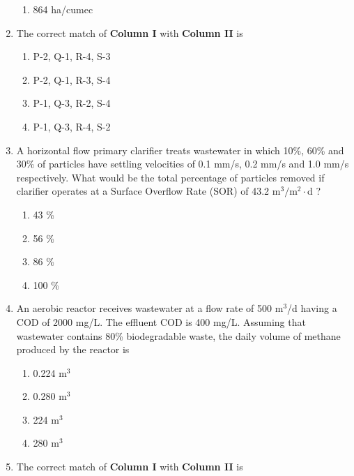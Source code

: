 \documentclass[journal]{IEEEtran}
\begin{document}
\begin{enumerate}
\begin{enumerate}
     \item 864 ha/cumec \\
 \end{enumerate}
\item The correct match of \textbf{Column I} with \textbf{Column II} is 
\begin{table}[h!]
  \centering
  
\end{table} 
\begin{enumerate}
    \item P-2, Q-1, R-4, S-3
    \item P-2, Q-1, R-3, S-4
    \item P-1, Q-3, R-2, S-4
    \item P-1, Q-3, R-4, S-2 \\
\end{enumerate}
\item A horizontal flow primary clarifier treats wastewater in which 10\%, 60\% and 30\% of particles have settling velocities of 0.1 mm/s, 0.2 mm/s and 1.0 mm/s respectively. What would be the total percentage of particles removed if clarifier operates at a Surface Overflow Rate (SOR) of 43.2 $\text{m}^3/\text{m}^2\cdot$d ?
\begin{enumerate}
    \item 43 \%
    \item 56 \%
    \item 86 \%
    \item 100 \% \\
\end{enumerate}
\item An aerobic reactor receives wastewater at a flow rate of 500 $\text{m}^3$/d having a COD of 2000 mg/L. The effluent COD is 400 mg/L. Assuming that wastewater contains 80\% biodegradable waste, the daily volume of methane produced by the reactor is
\begin{enumerate}
    \item 0.224 $\text{m}^3$
    \item 0.280 $\text{m}^3$
    \item 224 $\text{m}^3$
    \item 280 $\text{m}^3$ \\
\end{enumerate}
\item The correct match of \textbf{Column I} with \textbf{Column II} is
\begin{table}[h!]
  \centering
  
\end{table} 
 \begin{enumerate}

\end{enumerate}
\end{enumerate}
\end{document}
